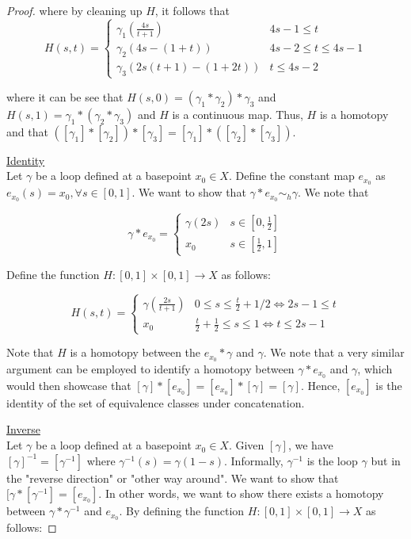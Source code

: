 \documentclass{article}
\theoremstyle{definition}
\begin{document}
\begin{proof}
where by cleaning up $H$, it follows that
\begin{equation*}
    H(s,t) =
    \begin{cases}
    \gamma_1(\frac{4s}{t+1}) & 4s-1 \leq t\\
    \gamma_2(4s-(1+t)) & 4s-2 \leq t \leq 4s-1\\
    \gamma_3(2s(t+1)-(1+2t)) & t \leq 4s-2
    \end{cases}
\end{equation*}

where it can be see that $H(s,0) = (\gamma_1*\gamma_2)*\gamma_3$ and $H(s,1) = \gamma_1*(\gamma_2*\gamma_3)$ and $H$ is a continuous map. Thus, $H$ is a homotopy and that $([\gamma_1]*[\gamma_2])*[\gamma_3]=[\gamma_1]*([\gamma_2]*[\gamma_3])$.

\underline{Identity}\\
Let $\gamma$ be a loop defined at a basepoint $x_0 \in X$. Define the constant map $e_{x_0}$ as $e_{x_0}(s) = x_0, \forall s \in [0,1]$. We want to show that $\gamma * e_{x_0} \sim_h \gamma$. We note that 

\begin{equation*}
    \gamma * e_{x_0} =
    \begin{cases}
    \gamma(2s) & s \in [0,\frac{1}{2}]\\
    x_0 & s \in [\frac{1}{2}, 1]
    \end{cases}
\end{equation*}

Define the function $H:[0,1] \times [0,1] \to X$ as follows:

\begin{equation*}
    H(s,t) =
    \begin{cases}
    \gamma(\frac{2s}{t+1}) & 0 \leq s \leq \frac{t}{2} + 1/2 \Leftrightarrow 2s-1 \leq t\\
    x_0 & \frac{t}{2} + \frac{1}{2} \leq s \leq 1 \Leftrightarrow t \leq 2s-1
    \end{cases}
\end{equation*}

Note that $H$ is a homotopy between the $e_{x_0} * \gamma$ and $\gamma$. We note that a very similar argument can be employed to identify a homotopy between $\gamma * e_{x_0}$ and $\gamma$, which would then showcase that $[\gamma]*[e_{x_0}] = [e_{x_0}]*[\gamma] = [\gamma]$. Hence, $[e_{x_0}]$ is the identity of the set of equivalence classes under concatenation.

\underline{Inverse}\\
Let $\gamma$ be a loop defined at a basepoint $x_0 \in X$. Given $[\gamma]$, we have $[\gamma]^{-1} = [\gamma^{-1}]$ where $\gamma^{-1}(s) = \gamma(1-s)$. Informally, $\gamma^{-1}$ is the loop $\gamma$ but in the "reverse direction" or "other way around". We want to show that $[\gamma * [\gamma^{-1}] = [e_{x_0}]$. In other words, we want to show there exists a homotopy between $\gamma * \gamma^{-1}$ and $e_{x_0}$. By defining the function $H:[0,1] \times [0,1] \to X$ as follows:


\end{proof}
\end{document}
